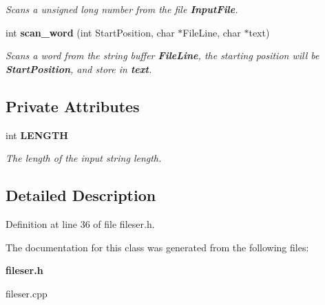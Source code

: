 \begin{CompactItemize}
\begin{CompactList}\small\item\em Scans a unsigned long number from the file {\bf InputFile}. \item\end{CompactList}\item 
int {\bf scan\_\-word} (int StartPosition, char $\ast$FileLine, char $\ast$text)\label{classFILESERVICE_40f12e95ef71688fdbacf30c7569c93a}

\begin{CompactList}\small\item\em Scans a word from the string buffer {\bf FileLine}, the starting position will be {\bf StartPosition}, and store in {\bf text}. \item\end{CompactList}\end{CompactItemize}
\subsection*{Private Attributes}
\begin{CompactItemize}
\item 
int {\bf LENGTH}\label{classFILESERVICE_60ea57d8b8d01444a1ecaaa86ba0ecc4}

\begin{CompactList}\small\item\em The length of the input string length. \item\end{CompactList}\end{CompactItemize}


\subsection{Detailed Description}


Definition at line 36 of file fileser.h.

The documentation for this class was generated from the following files:\begin{CompactItemize}
\item 
{\bf fileser.h}\item 
fileser.cpp\end{CompactItemize}
